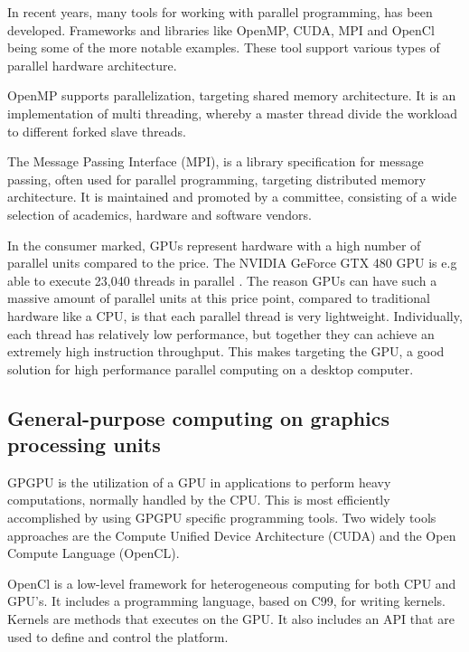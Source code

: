 In recent years, many tools for working with parallel programming, has been developed. Frameworks and libraries like OpenMP, CUDA, MPI and OpenCl being some of the more notable examples. These tool support various types of parallel hardware architecture.

OpenMP supports parallelization, targeting shared memory architecture. It is an implementation of multi threading, whereby a master thread divide the workload to different forked slave threads.

The Message Passing Interface (MPI), is a library specification for message passing, often used for parallel programming, targeting distributed memory architecture. It is maintained and promoted by a committee, consisting of a wide selection of academics, hardware and software vendors.

In the consumer marked, GPUs represent hardware with a high number of parallel units compared to the price. The NVIDIA GeForce GTX 480 GPU is e.g able to execute 23,040 threads in parallel \citep{karras2012}. The reason GPUs can have such a massive amount of parallel units at this price point, compared to traditional hardware like a CPU, is that each parallel thread is very lightweight. Individually, each thread has relatively low performance, but together they can achieve an extremely high instruction throughput. This makes targeting the GPU, a good solution for high performance parallel computing on a desktop computer.

\subsection{General-purpose computing on graphics processing units} %
\label{ssub:general_purpose_computing_on_graphics_processing_units}

GPGPU is the utilization of a GPU in applications to perform heavy computations, normally handled by the CPU\@. This is most efficiently accomplished by using GPGPU specific programming tools. Two widely tools approaches are the Compute Unified Device Architecture (CUDA) and the Open Compute Language (OpenCL).

OpenCl is a low-level framework for heterogeneous computing for both CPU and GPU's. It includes a programming language, based on C99, for writing kernels. Kernels are methods that executes on the GPU\@. It also includes an API that are used to define and control the platform.

